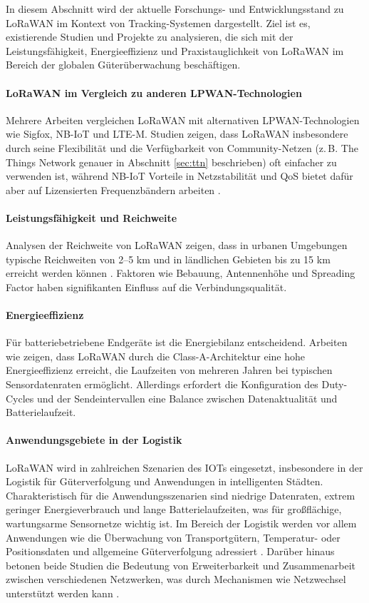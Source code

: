 In diesem Abschnitt wird der aktuelle Forschungs- und Entwicklungsstand zu LoRaWAN im Kontext von Tracking-Systemen dargestellt. Ziel ist es, existierende Studien und Projekte zu analysieren, die sich mit der Leistungsfähigkeit, Energieeffizienz und Praxistauglichkeit von LoRaWAN im Bereich der globalen Güterüberwachung beschäftigen. 

\paragraph*{LoRaWAN im Vergleich zu anderen LPWAN-Technologien}
Mehrere Arbeiten vergleichen LoRaWAN mit alternativen LPWAN-Technologien wie Sigfox, NB-IoT und LTE-M. Studien zeigen, dass LoRaWAN insbesondere durch seine Flexibilität und die Verfügbarkeit von Community-Netzen (z.\,B. The Things Network genauer in Abschnitt \ref{sec:ttn} beschrieben) oft einfacher zu verwenden ist, während NB-IoT Vorteile in Netzstabilität und QoS bietet dafür aber auf Lizensierten Frequenzbändern arbeiten \cite{mekki2019overview, centenaro2016long,adelantado2017understanding}.  

\paragraph*{Leistungsfähigkeit und Reichweite}
Analysen der Reichweite von LoRaWAN zeigen, dass in urbanen Umgebungen typische Reichweiten von 2–5 km und in ländlichen Gebieten bis zu 15 km erreicht werden können \cite{augustin2016study, petajajarvi2017coverage}. Faktoren wie Bebauung, Antennenhöhe und Spreading Factor haben signifikanten Einfluss auf die Verbindungsqualität. 

\paragraph*{Energieeffizienz}
Für batteriebetriebene Endgeräte ist die Energiebilanz entscheidend. Arbeiten wie \cite{fialhoBatteryLifetimeEstimation2020, raza2017low,qiu2018survey} zeigen, dass LoRaWAN durch die Class-A-Architektur eine hohe Energieeffizienz erreicht, die Laufzeiten von mehreren Jahren bei typischen Sensordatenraten ermöglicht. Allerdings erfordert die Konfiguration des Duty-Cycles und der Sendeintervallen eine Balance zwischen Datenaktualität und Batterielaufzeit.

\paragraph*{Anwendungsgebiete in der Logistik}
LoRaWAN wird in zahlreichen Szenarien des IOTs eingesetzt, insbesondere in der Logistik für Güterverfolgung und Anwendungen in intelligenten Städten. Charakteristisch für die Anwendungsszenarien sind niedrige Datenraten, extrem geringer Energieverbrauch und lange Batterielaufzeiten, was für großflächige, wartungsarme Sensornetze wichtig ist. Im Bereich der Logistik werden vor allem Anwendungen wie die Überwachung von Transportgütern, Temperatur- oder Positionsdaten und allgemeine Güterverfolgung adressiert \cite{qiu2018survey}. Darüber hinaus betonen beide Studien die Bedeutung von Erweiterbarkeit und Zusammenarbeit zwischen verschiedenen Netzwerken, was durch Mechanismen wie Netzwechsel unterstützt werden kann \cite{raza2017low}.
